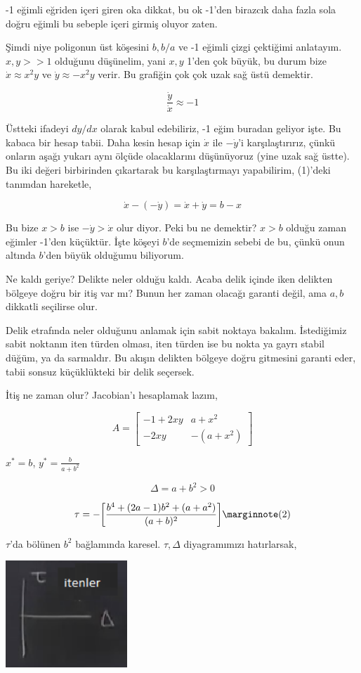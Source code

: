 \documentclass[12pt,fleqn]{article}\usepackage{../../common}
\begin{document}
-1 eğimli eğriden içeri giren oka dikkat, bu ok -1'den birazcık daha fazla sola
doğru eğimli bu sebeple içeri girmiş oluyor zaten.

Şimdi niye poligonun üst köşesini $b,b/a$ ve -1 eğimli çizgi çektiğimi
anlatayım. $x,y >> 1$ olduğunu düşünelim, yani $x,y$ 1'den çok büyük, bu durum
bize $\dot{x} \approx x^2y$ ve $\dot{y} \approx -x^2y$ verir. Bu grafiğin çok
çok uzak sağ üstü demektir.

$$ \frac{\dot{y}}{\dot{x}} \approx -1 $$

Üstteki ifadeyi $dy/dx$ olarak kabul edebiliriz, -1 eğim buradan geliyor
işte. Bu kabaca bir hesap tabii. Daha kesin hesap için $\dot{x}$ ile
$-\dot{y}$'i karşılaştırırız, çünkü onların aşağı yukarı aynı ölçüde
olacaklarını düşünüyoruz (yine uzak sağ üstte). Bu iki değeri birbirinden
çıkartarak bu karşılaştırmayı yapabilirim, (1)'deki tanımdan hareketle, 

$$ \dot{x} - (-\dot{y})  = \dot{x} + \dot{y} = b-x $$

Bu bize $x>b$ ise  $-\dot{y} > \dot{x}$ olur diyor. Peki bu ne demektir? $x>b$
olduğu zaman eğimler -1'den küçüktür. İşte köşeyi $b$'de seçmemizin sebebi de
bu, çünkü onun altında $b$'den büyük olduğumu biliyorum.

Ne kaldı geriye? Delikte neler olduğu kaldı. Acaba delik içinde iken delikten
bölgeye doğru bir itiş var mı? Bunun her zaman olacağı garanti değil, ama $a,b$
dikkatli seçilirse olur.

Delik etrafında neler olduğunu anlamak için sabit noktaya bakalım. İstediğimiz
sabit noktanın iten türden olması, iten türden ise bu nokta ya gayrı stabil
düğüm, ya da sarmaldır. Bu akışın delikten bölgeye doğru gitmesini garanti
eder, tabii sonsuz küçüklükteki bir delik seçersek.

İtiş ne zaman olur? Jacobian'ı hesaplamak lazım,

$$ 
A =
\left[\begin{array}{rr}
-1+2xy & a+x^2 \\ -2xy & -(a+x^2)
\end{array}\right]
$$

$ x^\ast = b$, $y^\ast = \frac{b}{a+b^2} $

$$ 
\Delta = a + b^2 > 0 
$$

$$ 
\tau = -\bigg[ \frac{b^4 + (2a-1)b^2 + (a+a^2) }{(a+b)^2} \bigg] 
\mlabel{2}
$$

$\tau$'da bölünen $b^2$ bağlamında karesel. $\tau,\Delta$ diyagramımızı
hatırlarsak,

\includegraphics[height=4cm]{09_17.png}
\end{document}

